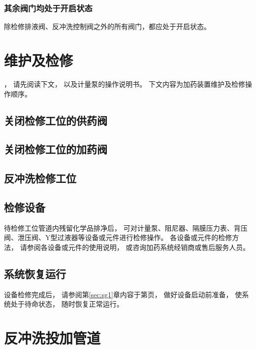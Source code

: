 \documentclass[UTF8,a4paper,12pt,titlepage]{ctexart}
\begin{document}
        \subsubsection{其余阀门均处于开启状态}
        除检修排液阀、反冲洗控制阀之外的所有阀门，都应处于开启状态。

\section{维护及检修}
，
请先阅读下文，
以及计量泵的操作说明书。
下文内容为加药装置维护及检修操作顺序。

    \subsection{关闭检修工位的供药阀}\label{sec:sg2}
    
    
    \subsection{关闭检修工位的加药阀}\label{sec:sg3}
    

\newpage


    \subsection{反冲洗检修工位}
    

    \subsection{检修设备}
    待检修工位管道内残留化学品排净后，
    可对计量泵、阻尼器、隔膜压力表、背压阀、泄压阀、Y型过液器等设备或元件进行检修操作。
    各设备或元件的检修方法，
    请参阅各设备或元件的使用说明，
    或咨询加药系统经销商或售后服务人员。

    \subsection{系统恢复运行}
    设备检修完成后，
    请参阅第\ref{sec:sg1}章内容于第\pageref{sec:sg1}页，
    做好设备启动前准备，
    使系统处于待命状态，
    随时恢复正常运行。

\section{反冲洗投加管道}
    
\end{document}
